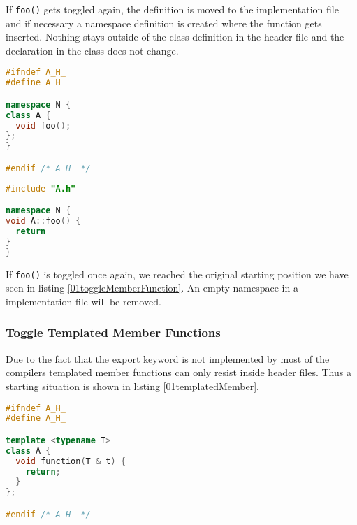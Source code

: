 If \texttt{foo()} gets toggled again, the definition is moved to the
implementation file and if necessary a namespace definition is created where
the function gets inserted. Nothing stays outside of the class definition in the
header file and the declaration in the class does not change.

\vspace{0.5cm}
\begin{minipage}{.48\textwidth}
\lstset{xrightmargin=0.5cm}
\begin{lstlisting}[caption={A.h, after moved definition},
label={03toggleMemberFunction}, language=C++]
#ifndef A_H_
#define A_H_

namespace N {
class A {
  void foo();
};
}

#endif /* A_H_ */
\end{lstlisting}
\end{minipage}%
\begin{minipage}{.48\textwidth}
\lstset{xleftmargin=0.5cm}
\begin{lstlisting}[caption={A.cpp with definition},
label={03_1toggleMemberFunction}, language=C++ ]
#include "A.h"

namespace N {
void A::foo() {
  return
}
}
\end{lstlisting}
\end{minipage}

If \texttt{foo()} is toggled once again, we reached the original starting
position we have seen in listing \ref{01toggleMemberFunction}. An empty
namespace in a implementation file will be removed.

\subsubsection{Toggle Templated Member Functions}
\label{templatedmember}

Due to the fact that the export keyword is not implemented by most of the
compilers templated member functions can only resist inside header files. Thus
a starting situation is shown in listing \ref{01templatedMember}.

\begin{lstlisting}[caption={A.h, in class definition with template parameters},
label={01templatedMember}, language=C++]
#ifndef A_H_
#define A_H_

template <typename T>
class A {
  void function(T & t) {
    return;
  }
};

#endif /* A_H_ */
\end{lstlisting}

